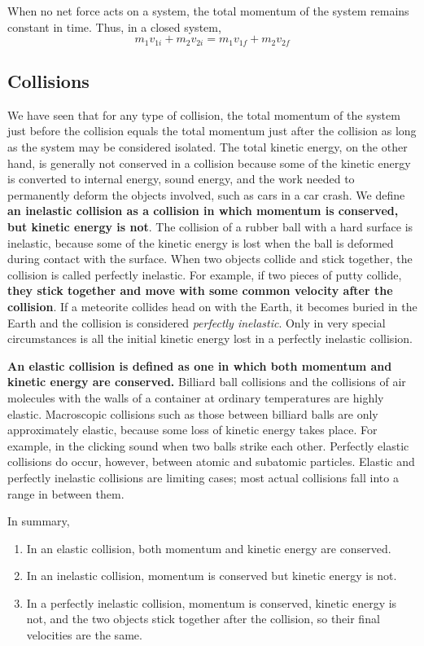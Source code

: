  \begin{defi}
 When no net force acts on a system, the total momentum of the system remains constant in time. Thus, in a closed system,
 $$m_1v_{1i} + m_2v_{2i} = m_1v_{1f} + m_2v_{2f}$$
 \end{defi}
 
 \subsection{Collisions}
 We have seen that for any type of collision, the total momentum of the system just before the collision equals the total momentum just after the collision as long as the system may be considered isolated. The total kinetic energy, on the other hand, is generally not conserved in a collision because some of the kinetic energy is converted to internal energy, sound energy, and the work needed to permanently deform the objects involved, such as cars in a car crash. We define \textbf{an inelastic collision as a collision in which momentum is conserved, but kinetic energy is not}. The collision of a rubber ball with a hard surface is inelastic, because some of the kinetic energy is lost when the ball is deformed during contact with the surface. When two objects collide and stick together, the collision is called
perfectly inelastic. For example, if two pieces of putty collide, \textbf{they stick together and move with some common velocity after the collision}. If a meteorite collides head on with the Earth, it becomes buried in the Earth and the collision is considered \emph{perfectly inelastic}. Only in very special circumstances is all the initial kinetic energy lost in a perfectly inelastic collision.

\textbf{An elastic collision is defined as one in which both momentum and kinetic energy are conserved.} Billiard ball collisions and the collisions of air molecules with the walls of a container at ordinary temperatures are highly elastic. Macroscopic collisions such as those between billiard balls are only approximately elastic, because some loss of kinetic energy takes place. For example, in the clicking sound when two balls strike each other. Perfectly elastic collisions do occur, however, between atomic and subatomic particles. Elastic and perfectly inelastic collisions are limiting cases; most actual collisions fall into a range in between them.
 
 In summary,
 \begin{enumerate}
\item In an elastic collision, both momentum and kinetic energy are conserved.
\item In an inelastic collision, momentum is conserved but kinetic energy is not.
\item In a perfectly inelastic collision, momentum is conserved, kinetic energy is not, and the two objects stick together after the collision, so their final velocities are the same.
 \end{enumerate}
 
